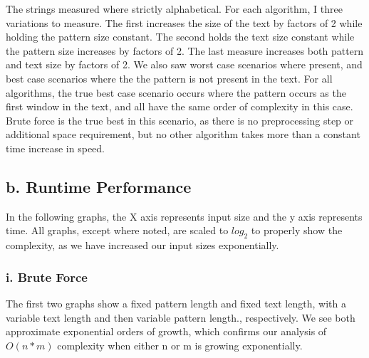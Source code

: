 \documentclass{chi2005}
\begin{document}
The strings measured where strictly alphabetical. For each algorithm, I three variations to measure. The first increases the size of the text by factors of 2 while holding the pattern size constant. The second holds the text size constant while the pattern size increases by factors of 2. The last measure increases both pattern and text size by factors of 2. We also saw worst case scenarios where present, and best case scenarios where the the pattern is not present in the text. For all algorithms, the true best case scenario occurs where the pattern occurs as the first window in the text, and all have the same order of complexity in this case. Brute force is the true best in this scenario, as there is no preprocessing step or additional space requirement, but no other algorithm takes more than a constant time increase in speed.

\subsection{b. Runtime Performance}

In the following graphs, the X axis represents input size and the y axis represents time. All graphs, except where noted, are scaled to $log_2$ to properly show the complexity, as we have increased our input sizes exponentially.

\subsubsection{i. Brute Force}

The first two graphs show a fixed pattern length and fixed text length, with a variable text length and then variable pattern length., respectively. We see both approximate exponential orders of growth, which confirms our analysis of $O(n*m)$ complexity when either n or m is growing exponentially.
\end{document}
